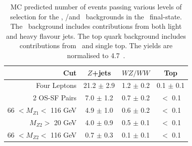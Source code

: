 \begin{table}[htbp]
  \centering
  \begin{tabular}{r|c|c|c} 
    \hline\hline
                 Cut &               $Z$+jets &             $WZ/WW$ &               Top\\ 
    \hline
        Four Leptons        &  21.2 $\pm$ 2.9  & 1.2 $\pm$ 0.2 & 0.1 $\pm$ 0.1 \\ 
       2 OS-SF Pairs        &  7.0  $\pm$ 1.2  & 0.7 $\pm$ 0.2 & $<$ 0.1 \\ 
66 $ < M_{Z1} < $ 116 GeV   &  4.9  $\pm$ 1.0  & 0.6 $\pm$ 0.2 & $<$ 0.1 \\ 
  $M_{Z2} > $ 20 GeV        &  4.0  $\pm$ 0.9  & 0.5 $\pm$ 0.1 & $<$ 0.1 \\ 
66 $ < M_{Z2} < $ 116 GeV   &  0.7  $\pm$ 0.3  & 0.1 $\pm$ 0.1 & $<$ 0.1 \\ 
    \hline\hline
  \end{tabular}
  \caption[MC predicted number of events passing various levels of selection for
  the \Zjets, \WZ/\WW and \topquark\ backgrounds in the \eemm\ final-state.]
  {MC predicted number of events passing various levels of selection for
  the \Zjets, \WZ/\WW and \topquark\ backgrounds in the \eemm\ final-state. The
  \Zjets\ background includes contributions from both light and heavy flavour
  jets. The top quark background includes contributions from \ttbar\ and
  single top. The yields are normalised to 4.7~\ifb.
  }
  \label{table:mc-bg-2e2mu}
\end{table}

